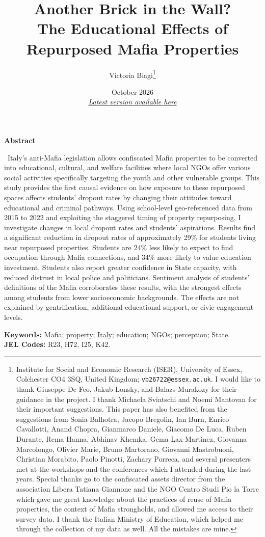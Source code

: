 \documentclass[12pt]{article}
\title{\normalfont \Large Another Brick in the Wall? \\ The Educational Effects of Repurposed Mafia Properties}
\author{Victoria Biagi\small{\thanks{Institute for Social and Economic Research (ISER), University of Essex, Colchester CO4 3SQ, United Kingdom; \texttt{vb26722@essex.ac.uk}. I would like to thank Giuseppe De Feo, Jakub Lonsky, and Balazs Murakozy for their guidance in the project. I thank Michaela Sviatschi and Noemi Mantovan for their important suggestions. This paper has also benefited from the suggestions from Sonia Balhotra, Jacopo Bregolin, Ian Burn, Enrico Cavallotti, Anand Chopra, Gianmarco Daniele, Giacomo De Luca, Ruben Durante, Rema Hanna, Abhinav Khemka, Gema Lax-Martinez, Giovanna Marcolongo, Olivier Marie, Bruno Martorano, Giovanni Mastrobuoni, Christian Morabito, Paolo Pinotti, Zachary Porreca, and several presenters met at the workshops and the conferences which I attended during the last years. Special thanks go to the confiscated assets director from the association Libera Tatiana Giannone and the NGO Centro Studi Pio la Torre which gave me great knowledge about the practices of reuse of Mafia properties, the context of Mafia strongholds, and allowed me access to their survey data. I thank the Italian Ministry of Education, which helped me through the collection of my data as well. All the mistakes are mine.}}}
\date{October 2026 \\[0.3cm]
{\small \href{https://github.com/victoriabiagi/JMP/raw/main/draft_sync.pdf}{\emph{Latest version available here}}}}
\theoremstyle{plain}
\theoremstyle{plain}
\theoremstyle{plain}
\theoremstyle{definition}
\theoremstyle{plain}
\theoremstyle{definition}
\theoremstyle{plain}
\theoremstyle{remark}
\theoremstyle{definition}
\theoremstyle{definition}
\theoremstyle{plain}
\begin{document}
      
\maketitle
\justifying
\vspace{-0.5cm}
 \begin{center}
    \textbf{\large{ \small{Abstract}}} \\ 
 \end{center}
 \vspace{-0.2cm}
  \small{
 Italy's anti-Mafia legislation allows confiscated Mafia properties to be converted into educational, cultural, and welfare facilities where local NGOs offer various social activities specifically targeting the youth and other vulnerable groups. This study provides the first causal evidence on how exposure to these repurposed spaces affects students' dropout rates by changing their attitudes toward educational and criminal pathways. Using school-level geo-referenced data from 2015 to 2022 and exploiting the staggered timing of property repurposing, I investigate changes in local dropout rates and students' aspirations. Results find a significant reduction in dropout rates of approximately 29\% for students living near repurposed properties. Students are 24\% less likely to expect to find occupation through Mafia connections, and 34\% more likely to value education investment.
 Students also report greater confidence in State capacity, with reduced distrust in local police and politicians. Sentiment analysis of students' definitions of the Mafia corroborates these results, with the strongest effects among students from lower socioeconomic backgrounds. The effects are not explained by gentrification, additional educational support, or civic engagement levels. } \par


\vspace{0.1cm}
\noindent\small{
\textbf{Keywords:} Mafia; property; Italy; education;  NGOs; perception; State. \\
\textbf{JEL Codes:} R23, H72, I25, K42. }
\newpage
\titleformat{\section}{\normalfont\Large\bfseries}{\thesection}{1em}{}
\titleformat{\subsection}{\normalfont\large\bfseries}{\thesubsection}{1em}{}
\titleformat{\subsubsection}{\normalfont\normalsize\bfseries}{\thesubsubsection}{1em}{}
\end{document}
